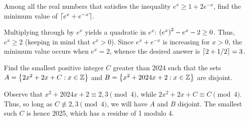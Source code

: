 \begin{question}[3]\label{Q::2024-O-1-5}
    Among all the real numbers that satisfies the inequality $e^x \geq 1 + 2e^{-x}$, find the minimum value of $\left\lceil e^x + e^{-x} \right\rceil$.
\end{question}
\begin{solution*}
    Multiplying through by $e^x$ yields a quadratic in $e^x$: $\left( e^x \right)^2 - e^x - 2 \geq 0$. Thus, $e^x \geq 2$ (keeping in mind that $e^x > 0$). Since $e^x + e^{-x}$ is increasing for $x > 0$, the minimum value occurs when $e^x = 2$, whence the desired answer is $\left\lceil 2 + 1/2 \right\rceil = 3$.
\end{solution*}

\begin{question}[2025]\label{Q::2024-O-1-6}
    Find the smallest positive integer $C$ greater than 2024 such that the sets $A = \left\lbrace 2x^2 + 2x + C : x \in \mathbb{Z} \right\rbrace$ and $B = \left\lbrace x^2 + 2024x + 2: x \in \mathbb{Z} \right\rbrace$ are disjoint.
\end{question}
\begin{solution*}
    Observe that $x^2 + 2024x + 2 \equiv 2, 3 \pmod{4}$, while $2x^2 + 2x + C \equiv C \pmod{4}$. Thus, so long as $C \not\equiv 2, 3 \pmod{4}$, we will have $A$ and $B$ disjoint. The smallest such $C$ is hence 2025, which has a residue of 1 modulo 4.
\end{solution*}

